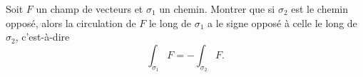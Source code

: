 
\begin{exercice}\label{exoOutilsMath-0033}

    Soit $F$ un champ de vecteurs et $\sigma_1$ un chemin. Montrer que si $\sigma_2$ est le chemin opposé, alors la circulation de $F$ le long de $\sigma_1$ a le signe opposé à celle le long de $\sigma_2$, c'est-à-dire
    \begin{equation}
        \int_{\sigma_1}F=-\int_{\sigma_2}F.
    \end{equation}

\end{exercice}
